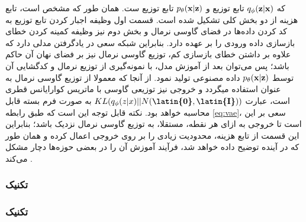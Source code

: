 که $q_\phi({\bf z}|{\bf x})$ تابع توزیع \encoder{} و $p_\theta({\bf x}|{\bf z})$ تابع توزیع \decoder ست. همان طور که مشخص است، تابع هزینه از دو بخش کلی تشکیل شده است. قسمت اول وظیفه اجبار کردن تابع توزیع \encoder{} به کد کردن داده‌ها در فضای گاوسی نرمال و بخش دوم نیز وظیفه کمینه کردن خطای بازسازی داده ورودی را بر عهده دارد. بنابراین شبکه سعی در یادگرفتن مدلی دارد که علاوه بر داشتن خطای بازسازی کم، توزیع گاوسی نرمال نیز بر فضای نهان آن حاکم باشد؛ پس می‌توان بعد از آموزش مدل، با نمونه‌گیری از توزیع نرمال و کدگشایی آن توسط $p_\theta({\bf x}|{\bf z})$ داده مصنوعی تولید نمود. از آنجا که معمولا از توزیع گاوسی نرمال به عنوان \priordist{} استفاده میگردد و خروجی \encoder{} نیز توزیعی گاوسی با ماتریس کوارایانس قطری است، عبارت $KL(q_\phi(z|x) || N(\textbf{\latin{0}},\textbf{\latin{I}}))$ به صورت فرم بسته قابل محاسبه خواهد بود. نکته قابل توجه این است که طبق رابطه \ref{eq:vae}، سعی بر این است تا خروجی \encoder{} به ازای هر نقطه، مستقلا، به توزیع گاوسی نرمال نزدیک باشد؛ بنابراین این قسمت از تابع هزینه، محدودیت زیادی را بر روی خروجی \encoder{} اعمال کرده و همان طور که در آینده توضیح داده خواهد شد، فرآیند آموزش آن را در بعضی حوزه‌ها دچار مشکل می‌کند \cite{vae_text}. \\
\subsubsection{تکنیک \reparametrization{}}
\subsubsection{تکنیک \reparametrization{}}

